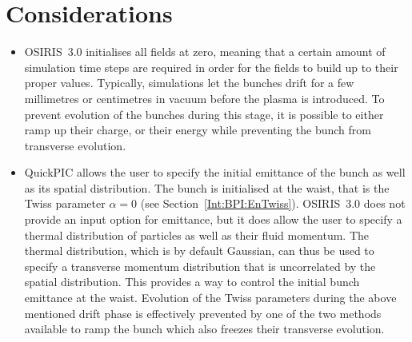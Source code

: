 \section{Considerations}
\label{PIC:Full}

\begin{itemize}
    \item OSIRIS~3.0 initialises all fields at zero, meaning that a certain amount of simulation time steps are required in order for the fields to build up to their proper values.
    Typically, simulations let the bunches drift for a few millimetres or centimetres in vacuum before the plasma is introduced.
    To prevent evolution of the bunches during this stage, it is possible to either ramp up their charge, or their energy while preventing the bunch from transverse evolution.
    
    \item QuickPIC allows the user to specify the initial emittance of the bunch as well as its spatial distribution.
    The bunch is initialised at the waist, that is the Twiss parameter $\alpha = 0$ (see Section~\ref{Int:BPI:EnTwiss}).
    OSIRIS~3.0 does not provide an input option for emittance, but it does allow the user to specify a thermal distribution of particles as well as their fluid momentum.
    The thermal distribution, which is by default Gaussian, can thus be used to specify a transverse momentum distribution that is uncorrelated by the spatial distribution.
    This provides a way to control the initial bunch emittance at the waist.
    Evolution of the Twiss parameters during the above mentioned drift phase is effectively prevented by one of the two methods available to ramp the bunch which also freezes their transverse evolution.
\end{itemize}
